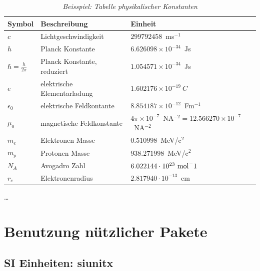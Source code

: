 \begin{table}[hhh]\parbox{12cm}{
  \caption[Physical constants]{\it Beisspiel: Tabelle physikalischer  Konstanten{\rm \cite{Beringer:1900zz}}
  }\label{tab:physconst}}
  \begin{tabular}{lll}
  \hline
  {\bf Symbol} & {\bf Beschreibung} & {\bf Einheit}  \\
  \hline \hline
     $c$    & Lichtgeschwindigkeit  &  $299792458$~ms$^{-1}$ \\
     $h$    & Planck Konstante & $6.626098 \times 10^{-34}$~Js \\
     $\hbar = \frac{h}{2 \pi}$ & Planck Konstante, reduziert &
            $1.054571 \times 10^{-34}$~Js \\
     $e$    & elektrische Elementarladung & $1.602176 \times 10^{-19}~C$ \\ 
  $\epsilon_0$ & elektrische Feldkontante & 
                  $8.854187 \times 10^{-12}$~Fm$^{-1}$ \\
  $\mu_0$       & magnetische Feldkonstante & $4\pi \times 
          10^{-7}$~NA$^{-2} = 12.566270 \times 10^{-7}$~NA$^{-2}$ \\
   $m_e$  & Elektronen Masse             &  $0.510998$~MeV/c$^2$\\
   $m_p$  & Protonen Masse               &  $938.271998$~MeV/c$^2$ \\        
   $N_A$  & Avogadro Zahl         & $6.022144 \cdot 
                                        10^{23}~{\rm mol}^-1 $ \\
   $r_e$  & Elektronenradius & $2.817940 \cdot 10^{-13}$~cm \\                                     
  \hline
  \end{tabular}
\end{table}



\dots


\section{Benutzung n\"utzlicher Pakete}
\label{ch:Kapitel1:sec:Pakete}

\subsection{SI Einheiten: siunitx}
\label{ch:Kapitel1:subsec:SiUnit}

